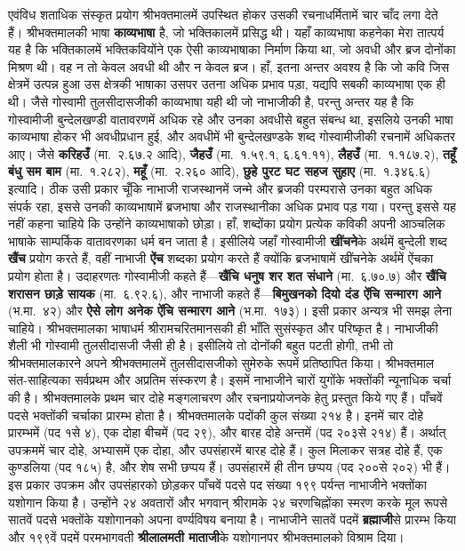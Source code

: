 \begin{sloppypar}\justifying{}
एवंविध शताधिक संस्कृत प्रयोग श्रीभक्तमालमें उपस्थित होकर उसकी रचनाधर्मितामें चार चाँद लगा देते हैं। श्रीभक्तमालकी भाषा \textbf{काव्यभाषा} है, जो भक्तिकालमें प्रसिद्ध थी। यहाँ काव्यभाषा कहनेका मेरा तात्पर्य यह है कि भक्तिकालमें भक्तिकवियोंने एक ऐसी काव्यभाषाका निर्माण किया था, जो अवधी और ब्रज दोनोंका मिश्रण थी। वह न तो केवल अवधी थी और न केवल ब्रज। हाँ, इतना अन्तर अवश्य है कि जो कवि जिस क्षेत्रमें उत्पन्न हुआ उस क्षेत्रकी भाषाका उसपर उतना अधिक प्रभाव पड़ा, यद्यपि सबकी काव्यभाषा एक ही थी। जैसे गोस्वामी तुलसीदासजीकी काव्यभाषा यही थी जो नाभाजीकी है, परन्तु अन्तर यह है कि गोस्वामीजी बुन्देलखण्डी वातावरणमें अधिक रहे और उनका अवधीसे बहुत संबन्ध था, इसलिये उनकी भाषा काव्यभाषा होकर भी अवधीप्रधान हुई, और अवधीमें भी बुन्देलखण्डके शब्द गोस्वामीजीकी रचनामें अधिकतर आए। जैसे \textbf{करिहउँ} (मा.~२.६७.२ आदि), \textbf{जैहउँ} (मा.~१.५९.१, ६.६१.११), \textbf{लैहउँ} (मा.~१.१८७.२), \textbf{तहूँ बंधु सम बाम} (मा.~१.२८२), \textbf{महूँ} (मा.~२.२६० आदि), \textbf{छुहे पुरट घट सहज सुहाए} (मा.~१.३४६.६) इत्यादि। ठीक उसी प्रकार चूँकि नाभाजी राजस्थानमें जन्मे और ब्रजकी परम्परासे उनका बहुत अधिक संपर्क रहा, इससे उनकी काव्यभाषामें ब्रजभाषा और राजस्थानीका अधिक प्रभाव पड़ गया। परन्तु इससे यह नहीं कहना चाहिये कि उन्होंने काव्यभाषाको छोड़ा। हाँ, शब्दोंका प्रयोग प्रत्येक कविकी अपनी आञ्चलिक भाषाके साम्पर्किक वातावरणका धर्म बन जाता है। इसीलिये जहाँ गोस्वामीजी \textbf{खींचने}के अर्थमें बुन्देली शब्द \textbf{खैंच} प्रयोग करते हैं, वहीं नाभाजी \textbf{ऐंच} शब्दका प्रयोग करते हैं क्योंकि ब्रजभाषामें खींचनेके अर्थमें ऐंचका प्रयोग होता है। उदाहरणतः गोस्वामीजी कहते हैं—\textbf{खैंचि धनुष शर शत संधाने} (मा.~६.७०.७) और \textbf{खैंचि शरासन छाड़े सायक} (मा.~६.९२.६), और नाभाजी कहते हैं—\textbf{बिमुखनको दियो दंड ऐंचि सन्मारग आने} (भ.मा.~४२) और \textbf{ऐसे लोग अनेक ऐंचि सन्मारग आने} (भ.मा.~१७३)। इसी प्रकार अन्यत्र भी समझ लेना चाहिये। श्रीभक्तमालका भाषाधर्म श्रीरामचरितमानसकी ही भाँति सुसंस्कृत और परिष्कृत है। नाभाजीकी शैली भी गोस्वामी तुलसीदासजी जैसी ही है। इसीलिये तो दोनोंकी बहुत पटती होगी, तभी तो श्रीभक्तमालकारने अपने श्रीभक्तमालमें तुलसीदासजीको सुमेरुके रूपमें प्रतिष्ठापित किया।
श्रीभक्तमाल संत-साहित्यका सर्वप्रथम और अप्रतिम संस्करण है। इसमें नाभाजीने चारों युगोंके भक्तोंकी न्यूनाधिक चर्चा की है। श्रीभक्तमालके प्रथम चार दोहे मङ्गलाचरण और रचना\-प्रयोजनके हेतु प्रस्तुत किये गए हैं। पाँचवें पदसे भक्तोंकी चर्चाका प्रारम्भ होता है। श्रीभक्तमालके पदोंकी कुल संख्या २१४ है। इनमें चार दोहे प्रारम्भमें (पद १से ४), एक दोहा बीचमें (पद २९), और बारह दोहे अन्तमें (पद २०३से २१४) हैं। अर्थात् उपक्रममें चार दोहे, अभ्यासमें एक दोहा, और उपसंहारमें बारह दोहे हैं। कुल मिलाकर सत्रह दोहे हैं, एक कुण्डलिया (पद १८५) है, और शेष सभी छप्पय हैं। उपसंहारमें ही तीन छप्पय (पद २००से २०२) भी हैं। इस प्रकार उपक्रम और उपसंहारको छोड़कर पाँचवें पदसे पद संख्या १९९ पर्यन्त नाभाजीने भक्तोंका यशोगान किया है। उन्होंने २४ अवतारों और भगवान् श्रीरामके २४ चरणचिह्नोंका स्मरण करके मूल रूपसे सातवें पदसे भक्तोंके यशोगानको अपना वर्ण्यविषय बनाया है। नाभाजीने सातवें पदमें \textbf{ब्रह्माजी}से प्रारम्भ किया और १९९वें पदमें परमभागवती \textbf{श्रीलालमती माताजी}के यशोगानपर श्रीभक्तमालको विश्राम दिया।

\end{sloppypar}
